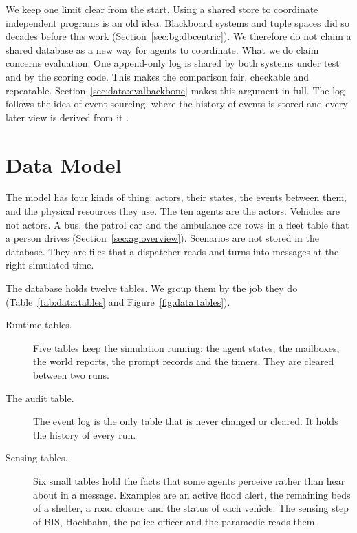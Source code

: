 We keep one limit clear from the start. Using a shared store to coordinate
independent programs is an old idea. Blackboard systems \parencite{nii1986}
and tuple spaces \parencite{gelernter1985} did so decades before this work
(Section~\ref{sec:bg:dbcentric}).
We therefore do not claim a shared database as a new way for agents to
coordinate. What we do claim concerns evaluation. One append-only log is shared
by both systems under test and by the scoring code. This makes the comparison
fair, checkable and repeatable. Section~\ref{sec:data:evalbackbone} makes this
argument in full. The log follows the idea of event sourcing, where the history
of events is stored and every later view is derived from it
\parencite{overeem2021}.

\section{Data Model}
\label{sec:data:conceptual}

The model has four kinds of thing: actors, their states, the events between
them, and the physical resources they use. The ten agents are the actors.
Vehicles are not actors. A bus, the patrol car and the ambulance are rows in a
fleet table that a person drives (Section~\ref{sec:ag:overview}). Scenarios are
not stored in the database. They are files that a dispatcher reads and turns
into messages at the right simulated time.

The database holds twelve tables. We group them by the job they do
(Table~\ref{tab:data:tables} and Figure~\ref{fig:data:tables}).

\begin{description}
  \item[Runtime tables.] Five tables keep the simulation running: the agent
  states, the mailboxes, the world reports, the prompt records and the timers.
  They are cleared between two runs.
  \item[The audit table.] The event log is the only table that is never
  changed or cleared. It holds the history of every run.
  \item[Sensing tables.] Six small tables hold the facts that some agents
  perceive rather than hear about in a message. Examples are an active flood
  alert, the remaining beds of a shelter, a road closure and the status of each
  vehicle. The sensing step of BIS, Hochbahn, the police officer and the
  paramedic reads them.
\end{description}

